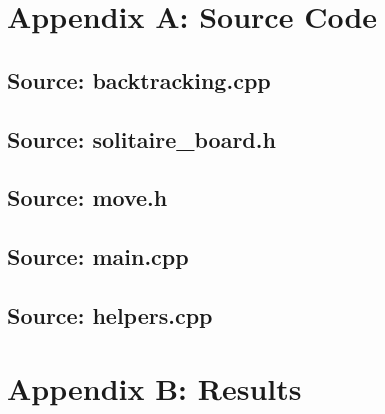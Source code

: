 \documentclass[a4paper]{article}
\begin{document}

{}
\break

\section*{Appendix A: Source Code}

\subsection{{Source: backtracking.cpp}}


\subsection{{Source: solitaire\_board.h}}


\subsection{{Source: move.h}}


\subsection{{Source: main.cpp}}


\subsection{{Source: helpers.cpp}}


\break
\section*{Appendix B: Results}
\end{document}
